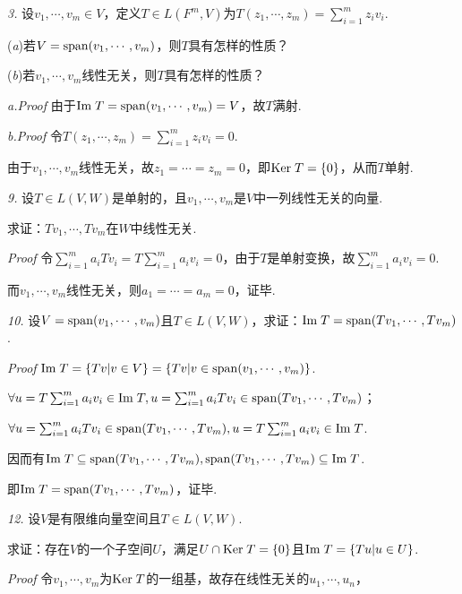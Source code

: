 \textit{3.}
设\(v_1,\cdots,v_m \in V\)，定义\(T \in L(F^m,V)\)为\(T(z_1,\cdots,z_m)=\sum_{i=1}^m z_iv_i\).

(\textit{a})若\(V=\mathrm{span} (v_1,\cdots,v_m)\)，则\(T\)具有怎样的性质？

(\textit{b})若\(v_1,\cdots,v_m\)线性无关，则\(T\)具有怎样的性质？

\textit{a.Proof}
由于\(\mathrm{Im \;} T=\mathrm{span} (v_1,\cdots,v_m)=V\)，故\(T\)满射.

\textit{b.Proof}
令\(T(z_1,\cdots,z_m)=\sum_{i=1}^m z_iv_i=0\).

由于\(v_1,\cdots,v_m\)线性无关，故\(z_1=\cdots=z_m=0\)，即\(\mathrm{Ker \;} T=\{0\}\)，从而\(T\)单射.

\hspace*{\fill}

\textit{9.}
设\(T\in L(V,W)\)是单射的，且\(v_1,\cdots,v_m\)是\(V\)中一列线性无关的向量.

求证：\(Tv_1,\cdots,Tv_m\)在\(W\)中线性无关.

\textit{Proof}
令\(\sum_{i=1}^m a_iTv_i=T\sum_{i=1}^m a_iv_i=0\)，由于\(T\)是单射变换，故\(\sum_{i=1}^m a_iv_i=0\).

而\(v_1,\cdots,v_m\)线性无关，则\(a_1=\cdots=a_m=0\)，证毕.

\hspace*{\fill}

\textit{10.}
设\(V=\mathrm{span} (v_1,\cdots,v_m)\)且\(T\in L(V,W)\)，求证：\(\mathrm{Im \;} T=\mathrm{span} (Tv_1,\cdots,Tv_m)\).

\textit{Proof}
\(\mathrm{Im \;} T=\{Tv|v\in V\}=\{Tv|v\in \mathrm{span}(v_1,\cdots,v_m)\}\).

\(\forall u=T\sum_{i=1}^m a_iv_i \in \mathrm{Im \;} T,u=\sum_{i=1}^m a_iTv_i \in \mathrm{span}(Tv_1,\cdots,Tv_m)\)；

\(\forall u=\sum_{i=1}^m a_iTv_i \in \mathrm{span}(Tv_1,\cdots,Tv_m),u=T\sum_{i=1}^m a_iv_i \in \mathrm{Im \;} T\).

因而有\(\mathrm{Im \;} T \subseteq \mathrm{span}(Tv_1,\cdots,Tv_m),\mathrm{span}(Tv_1,\cdots,Tv_m) \subseteq \mathrm{Im \;} T\).

即\(\mathrm{Im \;} T=\mathrm{span} (Tv_1,\cdots,Tv_m)\)，证毕.

\hspace*{\fill}

\textit{12.}
设\(V\)是有限维向量空间且\(T\in L(V,W)\).

求证：存在\(V\)的一个子空间\(U\)，满足\(U \cap \mathrm{Ker \;} T=\{0\}\)且\(\mathrm{Im \;} T=\{Tu|u\in U\}\).

\textit{Proof}
令\(v_1,\cdots,v_m\)为\(\mathrm{Ker \;} T\)的一组基，故存在线性无关的\(u_1,\cdots,u_n\)，

